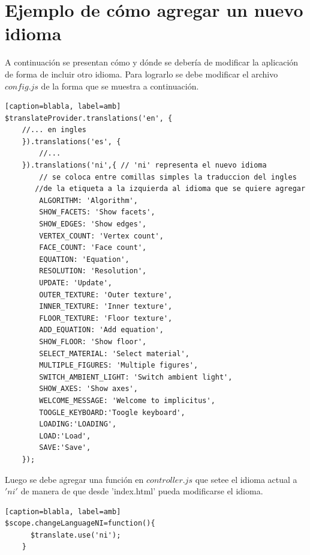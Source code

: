 \documentclass[12pt]{article}
\begin{document}
\section{Ejemplo de cómo agregar un nuevo idioma}
A continuación se presentan cómo y dónde se debería de modificar la aplicación de forma de incluir otro idioma. 
Para lograrlo se debe modificar el archivo $config.js$ de la forma que se muestra a continuación.
\begin{lstlisting}[frame=single][caption=blabla, label=amb]
$translateProvider.translations('en', {
   	//... en ingles  
    }).translations('es', {
        //...                 
    }).translations('ni',{ // 'ni' representa el nuevo idioma
        // se coloca entre comillas simples la traduccion del ingles 
       //de la etiqueta a la izquierda al idioma que se quiere agregar
        ALGORITHM: 'Algorithm', 
        SHOW_FACETS: 'Show facets',
        SHOW_EDGES: 'Show edges',
        VERTEX_COUNT: 'Vertex count',
        FACE_COUNT: 'Face count',
        EQUATION: 'Equation',
        RESOLUTION: 'Resolution',
        UPDATE: 'Update',
        OUTER_TEXTURE: 'Outer texture',
        INNER_TEXTURE: 'Inner texture',
        FLOOR_TEXTURE: 'Floor texture',
        ADD_EQUATION: 'Add equation',
        SHOW_FLOOR: 'Show floor',
        SELECT_MATERIAL: 'Select material',
        MULTIPLE_FIGURES: 'Multiple figures',
        SWITCH_AMBIENT_LIGHT: 'Switch ambient light',
        SHOW_AXES: 'Show axes',
        WELCOME_MESSAGE: 'Welcome to implicitus',
        TOOGLE_KEYBOARD:'Toogle keyboard',
        LOADING:'LOADING',
        LOAD:'Load',
        SAVE:'Save', 
    });
\end{lstlisting}
Luego se debe agregar una función en $controller.js$ que setee el idioma actual a $'ni'$ de manera de que desde 'index.html' pueda modificarse el idioma.
\begin{lstlisting}[frame=single][caption=blabla, label=amb]
$scope.changeLanguageNI=function(){
      $translate.use('ni');
    }
\end{lstlisting}
\clearpage
\end{document}
